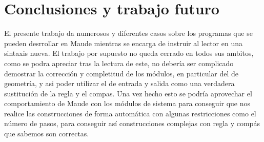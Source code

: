 
\section{Conclusiones y trabajo futuro}

El presente trabajo da numerosos y diferentes casos sobre los programas que se pueden desrrollar en Maude mientras se encarga de instruir al lector en una sintaxis nueva. El trabajo por supuesto no queda cerrado en todos sus ambitos, como se podra apreciar tras la lectura de este, no debería ser complicado demostrar la corrección y completitud de los módulos, en particular del de geometría, y asi poder utilizar el de entrada y salida como una verdadera sustitución de la regla y el compas. Una vez hecho esto se podría aprovechar el comportamiento de Maude con los módulos de sistema para conseguir que nos realice las construcciones de forma automática con algunas restricciones como el número de pasos, para conseguir así construcciones complejas con regla y compás que sabemos son correctas.\par
